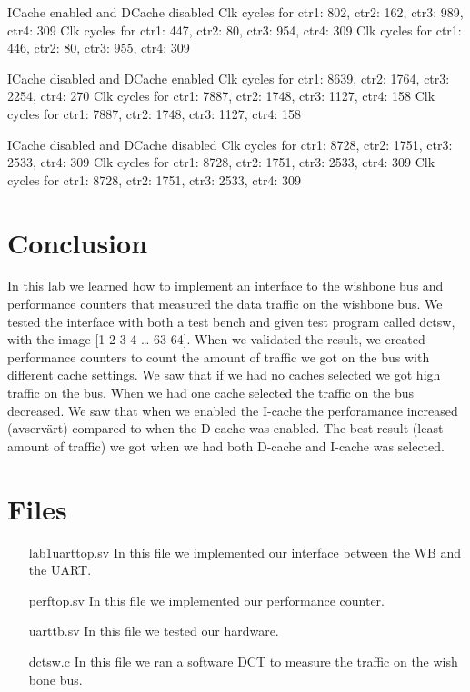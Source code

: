 \documentclass[a4paper]{article}
\begin{document}
ICache enabled and DCache disabled  \newline
Clk cycles for ctr1: 802, ctr2: 162, ctr3: 989, ctr4: 309  \newline
Clk cycles for ctr1: 447, ctr2:  80, ctr3: 954, ctr4: 309  \newline
Clk cycles for ctr1: 446, ctr2:  80, ctr3: 955, ctr4: 309  \newline  \newline

ICache disabled and DCache enabled \newline
Clk cycles for ctr1: 8639, ctr2: 1764, ctr3: 2254, ctr4: 270 \newline
Clk cycles for ctr1: 7887, ctr2: 1748, ctr3: 1127, ctr4: 158 \newline
Clk cycles for ctr1: 7887, ctr2: 1748, ctr3: 1127, ctr4: 158 \newline \newline

ICache disabled and DCache disabled \newline
Clk cycles for ctr1: 8728, ctr2: 1751, ctr3: 2533, ctr4: 309 \newline
Clk cycles for ctr1: 8728, ctr2: 1751, ctr3: 2533, ctr4: 309 \newline
Clk cycles for ctr1: 8728, ctr2: 1751, ctr3: 2533, ctr4: 309 \newline

\section{Conclusion}

In this lab we learned how to implement an interface to the wishbone bus and performance counters that measured the data traffic on the wishbone bus.  We tested the interface with both a test bench and given test program called dctsw, with the image [1 2 3 4 … 63 64]. When we validated the result, we created performance counters to count the amount of traffic we got on the bus with different cache settings. We saw that if we had no caches selected we got high traffic on the bus. When we had one cache selected the traffic on the bus decreased. We saw that when we enabled the I-cache the perforamance increased (avservärt) compared to when the D-cache was enabled. The best result (least amount of traffic) we got when we had both D-cache and I-cache was selected. 


\section{Files}
\begin{itemize}
	\item [lab1uarttop.sv] In this file we implemented our interface between the WB and the UART.
	\item [perftop.sv] In this file we implemented our performance counter.
	\item [uarttb.sv] In this file we tested our hardware.
	\item [dctsw.c] In this file we ran a software DCT to measure the traffic on the wish bone bus.
\end{itemize}
\end{document}
